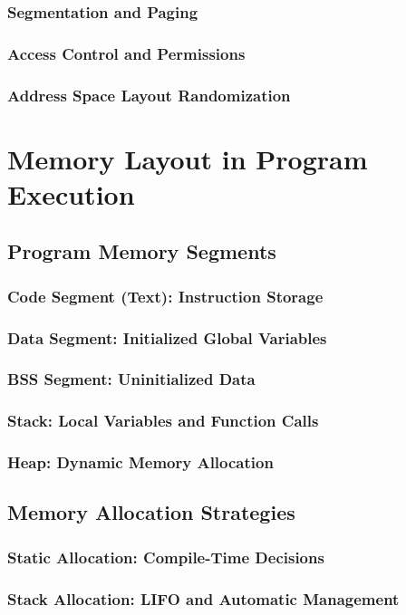 \documentclass[12pt, oneside]{book}
\begin{document}
\subsubsection{Segmentation and Paging}
\subsubsection{Access Control and Permissions}
\subsubsection{Address Space Layout Randomization}

\section{Memory Layout in Program Execution}
\subsection{Program Memory Segments}
\subsubsection{Code Segment (Text): Instruction Storage}
\subsubsection{Data Segment: Initialized Global Variables}
\subsubsection{BSS Segment: Uninitialized Data}
\subsubsection{Stack: Local Variables and Function Calls}
\subsubsection{Heap: Dynamic Memory Allocation}

\subsection{Memory Allocation Strategies}
\subsubsection{Static Allocation: Compile-Time Decisions}
\subsubsection{Stack Allocation: LIFO and Automatic Management}
\end{document}
